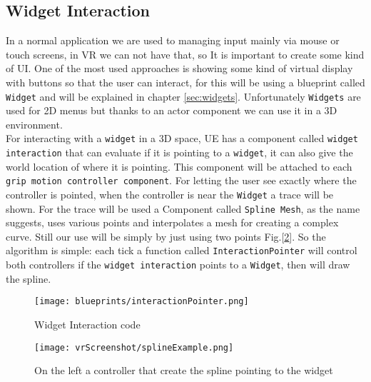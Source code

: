 \subsection{Widget Interaction}
\label{chp:widgetInteraction}
\noindent 
In a normal application we are used to managing input mainly via mouse or touch screens, in \ac{VR} we can not have that, so It is important to create some kind of \ac{UI}.
One of the most used approaches is showing some kind of virtual display with buttons so that the user can interact, for this will be using a blueprint called \texttt{Widget} and will be explained in chapter \ref{sec:widgets}.
Unfortunately \texttt{Widgets} are used for 2D menus but thanks to an actor component we can use it in a 3D environment.\\
For interacting with a \texttt{widget} in a 3D space, \ac{UE} has a component called \texttt{widget interaction} that can evaluate if it is pointing to a \texttt{widget}, it can also give the world location of where it is pointing. This component will be attached to each \texttt{grip motion controller component}.
For letting the user see exactly where the controller is pointed, when the controller is near the \texttt{Widget} a trace will be shown.
For the trace will be used a Component called \texttt{Spline Mesh}, as the name suggests, uses various points and interpolates a mesh for creating a complex curve.
Still our use will be simply by just using two points Fig.[\ref{fig:splineExample}]. So the algorithm is simple: each tick a function called \texttt{InteractionPointer} will control both controllers if the \texttt{widget interaction} points to a \texttt{Widget}, then will draw the spline.



\begin{figure}[ht]
    \centering
    \texttt{[image: blueprints/interactionPointer.png]}
    \caption{Widget Interaction code}
    \label{fig:InteractionPointer}
\end{figure}

\begin{figure}[ht]
    \centering
    \texttt{[image: vrScreenshot/splineExample.png]}
    \caption{On the left a controller that create the spline pointing to the widget}
    \label{fig:splineExample}
\end{figure}

